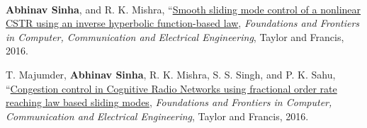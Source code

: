 \\
{\renewcommand{\labelenumi}{[\textbf{BC\arabic{enumi}}]}
	\begin{etaremune}[leftmargin=1cm]
		\item \textbf{Abhinav Sinha}, and R. K. Mishra, ``\href{https://books.google.co.in/books?hl=en\&lr=\&id=X7sODAAAQBAJ\&oi=fnd\&pg=PA79\&ots=3FdglJwlL5\&sig=YWdwW1W3CzBhjGUbEpRlhuimLGI\#v=onepage\&q\&f=false}{Smooth sliding mode control of a nonlinear CSTR using an inverse hyperbolic function-based law}, \emph{Foundations and Frontiers in Computer, Communication and Electrical Engineering}, Taylor and Francis, 2016.
		\item T. Majumder, \textbf{Abhinav Sinha}, R. K. Mishra, S. S. Singh, and P. K. Sahu, ``\href{https://books.google.co.in/books?hl=en\&lr=\&id=X7sODAAAQBAJ\&oi=fnd\&pg=PA91\&ots=3FdglJxeP7\&sig=JO2wdGNBWvOZCrQYqJMNn5lN34o\#v=onepage\&q\&f=false}{Congestion control in Cognitive Radio Networks using fractional order rate reaching law based sliding modes}, \emph{Foundations and Frontiers in Computer, Communication and Electrical Engineering}, Taylor and Francis, 2016.
\end{etaremune}}\medskip

